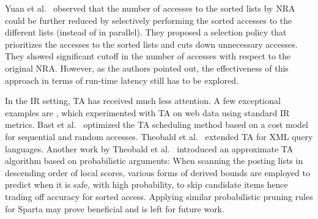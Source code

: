 Yuan et al.~\cite{yuan:2012} observed that the number of accesses to the sorted lists by NRA could be further reduced by selectively performing the sorted accesses to the different lists (instead of in parallel). They proposed a selection policy that prioritizes the accesses to the sorted lists and cuts down unnecessary accesses. They showed significant cutoff in the number of accesses with respect to the original NRA. However, 
as the authors pointed out, the effectiveness of this approach in terms of run-time latency still has to be explored.

In the IR setting, TA has received much less attention. A few exceptional examples are
\cite{Theobald:2004,Bast:2006,Theobald:2008}, which experimented with TA on web data  using standard IR metrics. Bast et al.~\cite{Bast:2006} optimized the TA scheduling method based on a cost model for sequential and random accesses. Theobald et al.~\cite{Theobald:2008} extended TA for XML query languages. Another work by Theobald et al.~\cite{Theobald:2004} introduced an approximate TA algorithm based on probabilistic arguments: When scanning the posting lists in descending order of local scores, various forms of derived bounds are employed to predict when it is safe, with high probability, to skip candidate items hence trading off accuracy for sorted access. Applying similar probabilistic pruning rules for Sparta  may prove beneficial and is left for future work.


 

 
